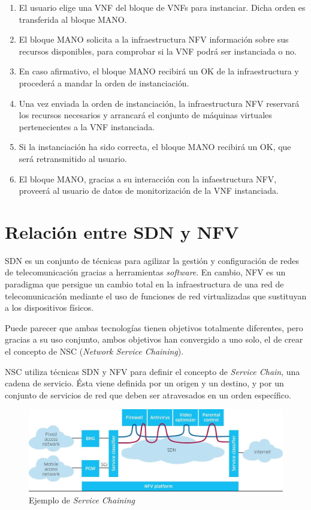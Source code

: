 \begin{enumerate}
	\item El usuario elige una VNF del bloque de VNFs para instanciar. Dicha orden es transferida al bloque MANO.
	\item El bloque MANO solicita a la infraestructura NFV información sobre sus recursos disponibles, para comprobar si la VNF podrá ser instanciada o no.
	\item En caso afirmativo, el bloque MANO recibirá un OK de la infraestructura y procederá a mandar la orden de instanciación.
	\item Una vez enviada la orden de instanciación, la infraestructura NFV reservará los recursos necesarios y arrancará el conjunto de máquinas virtuales pertenecientes a la VNF instanciada.
	\item Si la instanciación ha sido correcta, el bloque MANO recibirá un OK, que será retransmitido al usuario.
	\item El bloque MANO, gracias a su interacción con la infaestructura NFV, proveerá al usuario de datos de monitorización de la VNF instanciada.
\end{enumerate}

\section{Relación entre SDN y NFV}
\label{sec:sdnnfv}

SDN es un conjunto de técnicas para agilizar la gestión y configuración de redes de telecomunicación gracias a herramientas \textit{software}. En cambio, NFV es un paradigma que persigue un cambio total en la infraestructura de una red de telecomunicación mediante el uso de funciones de red virtualizadas que sustituyan a los dispositivos físicos.

Puede parecer que ambas tecnologías tienen objetivos totalmente diferentes, pero gracias a su uso conjunto, ambos objetivos han convergido a uno solo, el de crear el concepto de NSC (\textit{Network Service Chaining}).

NSC utiliza técnicas SDN y NFV para definir el concepto de \textit{Service Chain}, una cadena de servicio. Ésta viene definida por un origen y un destino, y por un conjunto de servicios de red que deben ser atravesados en un orden específico.

\begin{figure}[!ht]
	\centering
	\includegraphics[width=0.8\linewidth]{imagenes/servicechaining}
	\caption{Ejemplo de \textit{Service Chaining}}
	\label{fig:servicechaining}
\end{figure}

